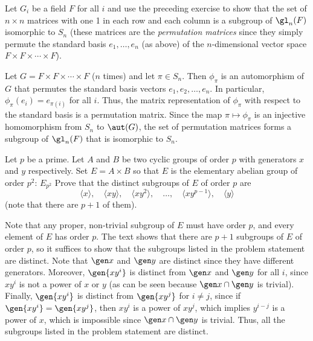 \begin{exercise}\label{ex5.1.9}
    Let $G_i$ be a field $F$ for all $i$ and use the preceding exercise to show that the set of $n \times n$ matrices with one 1 in each row and each column is a subgroup of $\gl_n(F)$ isomorphic to $S_n$ (these matrices are the \emph{permutation matrices} since they simply permute the standard basis $e_1, \ldots, e_n$ (as above) of the $n$-dimensional vector space $F \times F \times \cdots \times F$).
\end{exercise}

\begin{sol}
    Let $G = F \times F \times \cdots \times F$ ($n$ times) and let $\pi \in S_n$. Then $\phi_\pi$ is an automorphism of $G$ that permutes the standard basis vectors $e_1, e_2, \ldots, e_n$. In particular, $\phi_\pi(e_i) = e_{\pi(i)}$ for all $i$. Thus, the matrix representation of $\phi_\pi$ with respect to the standard basis is a permutation matrix. Since the map $\pi \mapsto \phi_\pi$ is an injective homomorphism from $S_n$ to $\aut(G)$, the set of permutation matrices forms a subgroup of $\gl_n(F)$ that is isomorphic to $S_n$.
\end{sol}

\begin{exercise}\label{ex5.1.10}
    Let $p$ be a prime. Let $A$ and $B$ be two cyclic groups of order $p$ with generators $x$ and $y$ respectively. Set $E = A \times B$ so that $E$ is the elementary abelian group of order $p^2$: $E_{p^2}$ Prove that the distinct subgroups of $E$ of order $p$ are
    \[\langle x \rangle, \quad \langle xy \rangle, \quad \langle xy^2 \rangle, \quad \ldots, \quad \langle xy^{p-1} \rangle, \quad \langle y \rangle\] (note that there are $p + 1$ of them).
\end{exercise}

\begin{sol}
    Note that any proper, non-trivial subgroup of $E$ must have order $p$, and every element of $E$ has order $p$. The text shows that there are $p + 1$ subgroups of $E$ of order $p$, so it suffices to show that the subgroups listed in the problem statement are distinct. Note that $\gen x$ and $\gen y$ are distinct since they have different generators. Moreover, $\gen{xy^i}$ is distinct from $\gen x$ and $\gen y$ for all $i$, since $xy^i$ is not a power of $x$ or $y$ (as can be seen because $\gen x \cap \gen y$ is trivial). Finally, $\gen{xy^i}$ is distinct from $\gen{xy^j}$ for $i \neq j$, since if $\gen{xy^i} = \gen{xy^j}$, then $xy^i$ is a power of $xy^j$, which implies $y^{i-j}$ is a power of $x$, which is impossible since $\gen x \cap \gen y$ is trivial. Thus, all the subgroups listed in the problem statement are distinct.
\end{sol}


